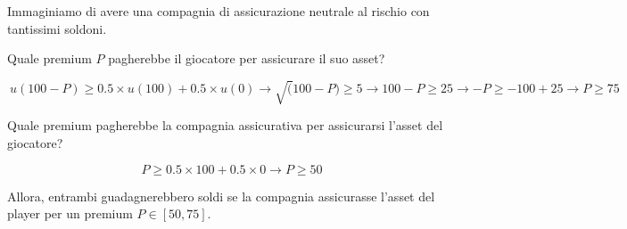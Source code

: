 Immaginiamo di avere una compagnia di assicurazione neutrale al rischio con tantissimi soldoni.

Quale premium $P$ pagherebbe il giocatore per assicurare il suo asset?

\[\
  u(100-P) \geq 0.5 \times u(100) + 0.5 \times u(0) \rightarrow \sqrt(100-P) \geq 5 \rightarrow 100-P \geq 25 \rightarrow -P \geq -100+25 \rightarrow P \geq 75  
\]

Quale premium pagherebbe la compagnia assicurativa per assicurarsi l'asset del giocatore?

\[
  P \geq 0.5 \times 100 + 0.5 \times 0 \rightarrow P \geq 50  
\]

Allora, entrambi guadagnerebbero soldi se la compagnia assicurasse l'asset del player 
per un premium $P \in [50,75]$.

\newpage